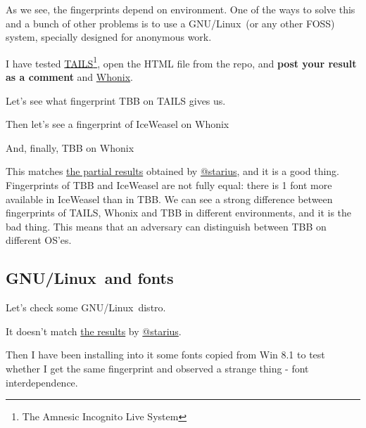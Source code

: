 \documentclass[letterpaper,14pt]{article}
\begin{document}
As we see, the fingerprints depend on environment. One of the ways to solve this and a bunch of other problems is to use a GNU/Linux\texttrademark\ (or any other FOSS) system, specially designed for anonymous work.

I have tested \href{https://tails.boum.org/}{TAILS}\footnote{The Amnesic Incognito Live System}, open the HTML file from the repo, and \textbf{post your result as a comment} and \href{https://www.whonix.org/}{Whonix}.

Let's see what fingerprint TBB on TAILS gives us.



Then let's see a fingerprint of IceWeasel on Whonix



And, finally, TBB on Whonix



This matches \href{https://geektimes.ru/post/244484/\#comment_8227810}{the partial results} obtained by \href{https://geektimes.ru/users/starius/}{@starius}, and it is a good thing. Fingerprints of TBB and IceWeasel are not fully equal: there is 1 font more available in IceWeasel than in TBB. We can see a strong difference between fingerprints of TAILS, Whonix and TBB in different environments, and it is the bad thing. This means that an adversary can distinguish between TBB on different OS'es.

\subsection{GNU/Linux\texttrademark\ and fonts}\label{linux-and-fonts}

Let's check some GNU/Linux\texttrademark\ distro.



It doesn't match \href{https://geektimes.ru/post/244484/\#comment_8227810}{the results} by \href{https://geektimes.ru/users/starius/}{@starius}.

Then I have been installing into it some fonts copied from Win 8.1 to test whether I get the same fingerprint and observed a strange thing - font interdependence.
\end{document}
